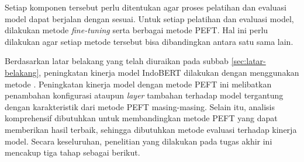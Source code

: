 Setiap komponen tersebut perlu ditentukan agar proses pelatihan dan evaluasi model dapat berjalan dengan sesuai. Untuk setiap pelatihan dan evaluasi model, dilakukan metode \textit{fine-tuning} serta berbagai metode PEFT. Hal ini perlu dilakukan agar setiap metode tersebut bisa dibandingkan antara satu sama lain.


Berdasarkan latar belakang yang telah diuraikan pada subbab \ref{sec:latar-belakang}, peningkatan kinerja model IndoBERT dilakukan dengan menggunakan metode \PEFT. Peningkatan kinerja model dengan metode PEFT ini melibatkan penambahan konfigurasi ataupun \textit{layer} tambahan terhadap model tergantung dengan karakteristik dari metode PEFT masing-masing. Selain itu, analisis komprehensif dibutuhkan untuk membandingkan metode PEFT yang dapat memberikan hasil terbaik, sehingga dibutuhkan metode evaluasi terhadap kinerja model. Secara keseluruhan, penelitian yang dilakukan pada tugas akhir ini mencakup tiga tahap sebagai berikut.


